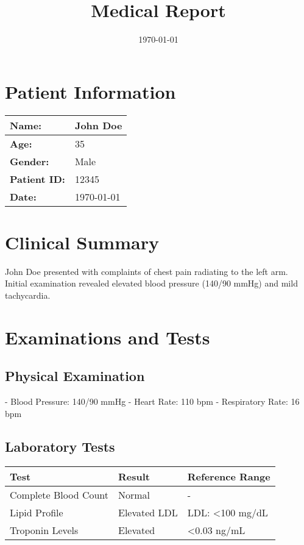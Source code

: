 \documentclass[a4paper,12pt]{article}
\title{\textbf{Medical Report}}
\author{}
\date{\today}
\begin{document}
\maketitle

\section*{Patient Information}
\begin{tabular}{|l|l|}
\hline
\textbf{Name:}       & John Doe \\ \hline
\textbf{Age:}        & 35 \\ \hline
\textbf{Gender:}     & Male \\ \hline
\textbf{Patient ID:} & 12345 \\ \hline
\textbf{Date:}       & \today \\ \hline
\end{tabular}

\vspace{1cm}

\section*{Clinical Summary}
John Doe presented with complaints of chest pain radiating to the left arm. Initial examination revealed elevated blood pressure (140/90 mmHg) and mild tachycardia.

\section*{Examinations and Tests}
\subsection*{Physical Examination}
- Blood Pressure: 140/90 mmHg  
- Heart Rate: 110 bpm  
- Respiratory Rate: 16 bpm  

\subsection*{Laboratory Tests}
\begin{tabular}{|l|l|l|}
\hline
\textbf{Test}         & \textbf{Result} & \textbf{Reference Range} \\ \hline
Complete Blood Count  & Normal          & -                        \\ \hline
Lipid Profile         & Elevated LDL    & LDL: <100 mg/dL          \\ \hline
Troponin Levels       & Elevated        & <0.03 ng/mL              \\ \hline
\end{tabular}
\end{document}
